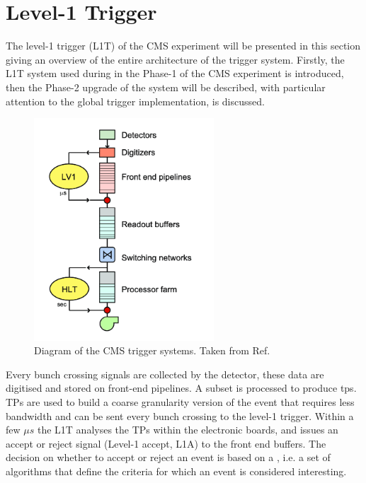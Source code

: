 \documentclass[../../main.tex]{subfiles}
\begin{document}
\section{Level-1 Trigger}
\label{sec:L1T}

The level-1 trigger (L1T) of the CMS experiment will be presented in this section giving an overview of the entire architecture of the trigger system. Firstly, the L1T system used during in the
Phase-1 of the CMS experiment is introduced, then the Phase-2 upgrade of the system will be described, with particular attention to the global trigger implementation, is discussed.  

\begin{figure}[h]
    \centering
    \includegraphics[width=0.6\textwidth]{sections/02/Images/L1T_scheme.png}
    \caption{Diagram of the CMS trigger systems. Taken from Ref. \cite{L1T}}
    \label{fig:L1T_diagram}
\end{figure}

Every bunch crossing signals are collected by the detector, these data are digitised and stored on front-end pipelines. A subset is processed to produce \acrfull{tps}. TPs are used to build a coarse granularity version of the event that requires less bandwidth and can be sent every bunch crossing to the level-1 trigger. Within a
few $\mu s$ the L1T analyses the TPs within the electronic boards, and issues an accept or reject signal (Level-1 accept, L1A) to the front end buffers. The decision on whether to accept or reject an event is based on a , i.e. a set of algorithms that define the criteria for which an event is considered interesting.  
\end{document}
